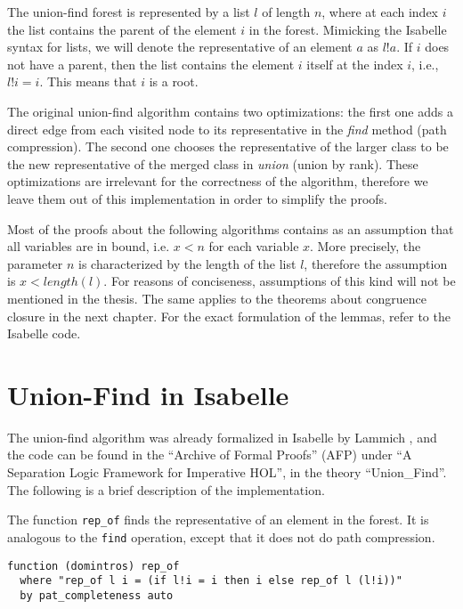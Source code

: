 The union-find forest is represented by a list $l$ of length $n$, where at each index $i$ the list contains the parent of the element $i$ in the forest.
Mimicking the Isabelle syntax for lists, we will denote the representative of an element $a$ as $l ! a$.
If $i$ does not have a parent, then the list contains the element $i$ itself at the index $i$, i.e., $l!i = i$. This means that $i$ is a root.

The original union-find algorithm \cite{Tarjan} contains two optimizations: the first one adds a direct edge from each visited node to its representative in the \emph{find} method (path compression). The second one chooses the representative of the larger class to be the new representative of the merged class in \emph{union} (union by rank). These optimizations are irrelevant for the correctness of the algorithm, therefore we leave them out of this implementation in order to simplify the proofs.

Most of the proofs about the following algorithms contains as an assumption that all variables are in bound, i.e. $x < n$ for each variable $x$.
More precisely, the parameter $n$ is characterized by the length of the list $l$, therefore the assumption is $x < length(l)$.
For reasons of conciseness, assumptions of this kind will not be mentioned in the thesis. The same applies to the theorems about congruence closure in the next chapter.
For the exact formulation of the lemmas, refer to the Isabelle code.

\section{Union-Find in Isabelle}
\label{section:uf-isabelle}

The union-find algorithm was already formalized in Isabelle by Lammich \cite{unionfind-isabelle}, and the code can be found in the ``Archive of Formal Proofs'' (AFP) under ``A Separation Logic Framework for Imperative HOL'', in the theory ``Union\_Find''\cite{afp, Sep}. The following is a brief description of the implementation.

The function \lstinline{rep_of} finds the representative of an element in the forest. It is analogous to the \lstinline{find} operation, except that it does not do path compression.

\begin{lstlisting}
function (domintros) rep_of
  where "rep_of l i = (if l!i = i then i else rep_of l (l!i))"
  by pat_completeness auto
\end{lstlisting}

